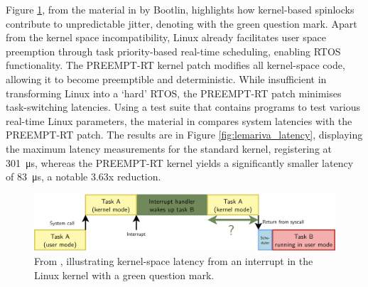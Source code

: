 Figure \ref{fig:bootlin_flow}, from the material in \cite{bootlinUnderstandingLinuxRealtime2024} by Bootlin, highlights how kernel-based spinlocks contribute to unpredictable jitter, denoting with the green question mark. Apart from the kernel space incompatibility, Linux already facilitates user space preemption through task priority-based real-time scheduling, enabling RTOS functionality. The PREEMPT-RT kernel patch modifies all kernel-space code, allowing it to become preemptible and deterministic. While insufficient in transforming Linux into a `hard' RTOS, the PREEMPT-RT patch minimises task-switching latencies. Using a test suite that contains programs to test various real-time Linux parameters, the material in \cite{maurorivaRaspberryPi4B2019} compares system latencies with the PREEMPT-RT patch. The results are in Figure \ref{fig:lemariva_latency}, displaying the maximum latency measurements for the standard kernel, registering at \SI{301}{\micro\second}, whereas the PREEMPT-RT kernel yields a significantly smaller latency of \SI{83}{\micro\second}, a notable 3.63x reduction.

\begin{figure}[H]
    \centering
    \includegraphics[width=1\textwidth]{assets/bootlin-interrupt-flow.png}
    \caption{From \cite{bootlinUnderstandingLinuxRealtime2024}, illustrating kernel-space latency from an interrupt in the Linux kernel with a green question mark.}
    \label{fig:bootlin_flow}
\end{figure}

